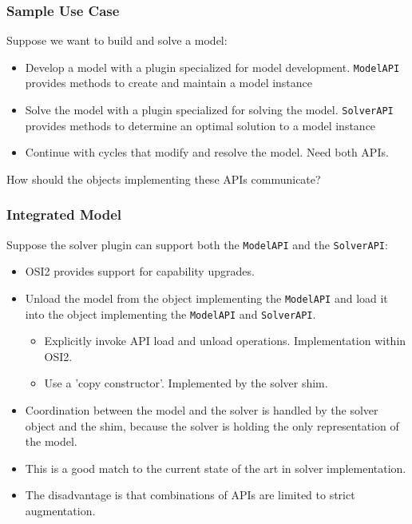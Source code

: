 \documentclass{beamer}
\begin{document}
\begin{frame}
  \frametitle{Sample Use Case}

  Suppose we want to build and solve a model:

  \begin{itemize}
  \item Develop a model with a plugin specialized for model
    development.  \lstinline|ModelAPI| provides methods to create
    and maintain a model instance
  \item Solve the model with a plugin specialized for solving the
    model.  \lstinline|SolverAPI| provides methods to determine an
    optimal solution to a model instance
  \item Continue with cycles that modify and resolve the model.
    Need both APIs.
  \end{itemize}

  How should the objects implementing these APIs communicate?
\end{frame}

\begin{frame}
  \frametitle{Integrated Model}

  Suppose the solver plugin can support both the \lstinline|ModelAPI| and the
  \lstinline|SolverAPI|:
  \begin{itemize}
  \item OSI2 provides support for capability upgrades.
  \item Unload the model from the object implementing the
    \lstinline|ModelAPI| and load it into the object implementing
    the \lstinline|ModelAPI| and \lstinline|SolverAPI|.
    \begin{itemize}
    \item Explicitly invoke API load and unload operations.
      Implementation within OSI2.
    \item Use a 'copy constructor'.  Implemented by the solver shim.
    \end{itemize}
    \pause 
  \item Coordination between the model and the solver is handled by
    the solver object and the shim, because the solver is holding
    the only representation of the model.
  \item This is a good match to the current state of the art in
    solver implementation.
  \item The disadvantage is that combinations of APIs are limited to
    strict augmentation.
  \end{itemize}
\end{frame}
\end{document}
